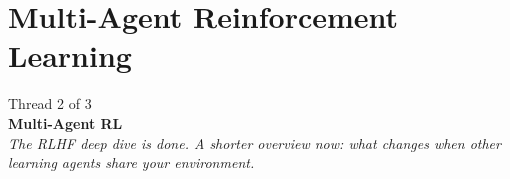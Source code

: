 \section{Multi-Agent Reinforcement Learning}

\begin{frame}{}
\vfill
\centering
{\large Thread 2 of 3}\\[0.5em]
{\LARGE \textbf{Multi-Agent RL}}\\[0.8em]
{\footnotesize\itshape The RLHF deep dive is done. A shorter overview now: what
changes when \emph{other learning agents} share your environment.}
\vfill
\end{frame}

